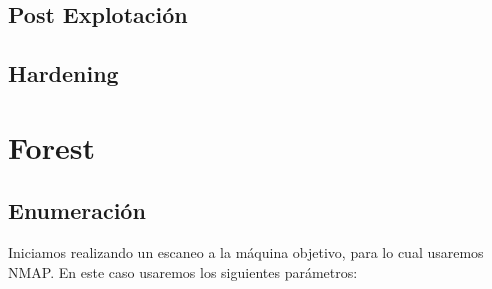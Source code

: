 \documentclass{article}
\begin{document}
\subsection{Post Explotación}

\subsection{Hardening}


\clearpage 

\section{Forest}
\subsection{Enumeración}
Iniciamos realizando un escaneo a la máquina objetivo, para lo cual usaremos NMAP. En este caso usaremos los siguientes parámetros:
\end{document}
